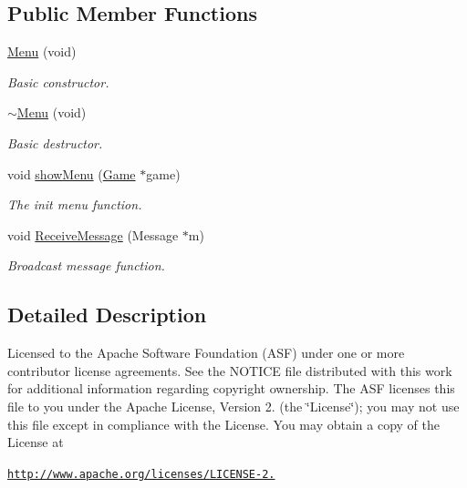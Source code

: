 \subsection*{Public Member Functions}
\begin{DoxyCompactItemize}
\item 
\hyperlink{class_menu_a0c1481a62f6b0bf63a506d2622f2244f}{Menu} (void)
\begin{DoxyCompactList}\small\item\em Basic constructor. \end{DoxyCompactList}\item 
\hypertarget{class_menu_a73932d2ddab91e989102211f81c98c76}{\hyperlink{class_menu_a73932d2ddab91e989102211f81c98c76}{$\sim$\-Menu} (void)}\label{class_menu_a73932d2ddab91e989102211f81c98c76}

\begin{DoxyCompactList}\small\item\em Basic destructor. \end{DoxyCompactList}\item 
void \hyperlink{class_menu_a49984eb86ba63299629f3a84876499be}{show\-Menu} (\hyperlink{class_game}{Game} $\ast$game)
\begin{DoxyCompactList}\small\item\em The init menu function. \end{DoxyCompactList}\item 
void \hyperlink{class_menu_ab8cc125a548bd9d0c75ecc222df093e8}{Receive\-Message} (Message $\ast$m)
\begin{DoxyCompactList}\small\item\em Broadcast message function. \end{DoxyCompactList}\end{DoxyCompactItemize}


\subsection{Detailed Description}
Licensed to the Apache Software Foundation (A\-S\-F) under one or more contributor license agreements. See the N\-O\-T\-I\-C\-E file distributed with this work for additional information regarding copyright ownership. The A\-S\-F licenses this file to you under the Apache License, Version 2. (the \char`\"{}\-License\char`\"{}); you may not use this file except in compliance with the License. You may obtain a copy of the License at

\href{http://www.apache.org/licenses/LICENSE-2.0}{\tt http\-://www.\-apache.\-org/licenses/\-L\-I\-C\-E\-N\-S\-E-\/2.}

